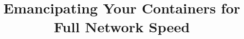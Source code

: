 \documentclass{cls/hotnets16}
\def\harry#1{{\textcolor{purple}{harry: {\sf #1}}}}
\newcommand{\vyas}[1]{{\footnotesize\color{red}[VS: #1]}}
\begin{document}
\title{Emancipating Your Containers for Full Network Speed}


\date{}


\maketitle
\thispagestyle{empty}












\end{document}
